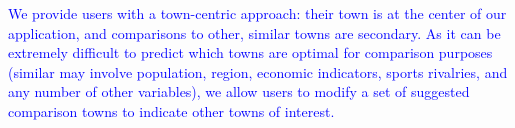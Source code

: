 \documentclass[10pt]{article}\usepackage[]{graphicx}\usepackage[]{color}
\newcommand{\svp}[1]{{\textcolor{blue}{#1}}}
\begin{document}



\svp{We provide users with a town-centric approach: their town is at the center of our application, and comparisons to other, similar towns are secondary. As it can be extremely difficult to predict which towns are optimal for comparison purposes (similar may involve population, region, economic indicators, sports rivalries, and any number of other variables), we allow users to modify a set of suggested comparison towns to indicate other towns of interest.}
\end{document}
